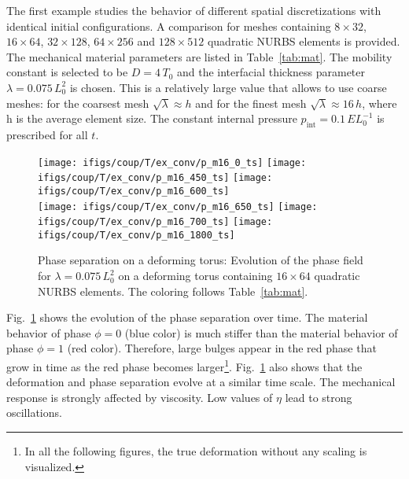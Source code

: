 \documentclass[11pt]{article}
\begin{document}
The first example studies the behavior of different spatial discretizations with identical initial configurations. 
A comparison for meshes containing $8 \times 32$, $16 \times 64$,  $32 \times 128$, $64 \times 256$ and  $128 \times 512$ quadratic NURBS elements is provided. 
The mechanical material parameters are listed in Table~\ref{tab:mat}. 
The mobility constant is selected to be $D=4\,T_0$ and the interfacial thickness parameter $\lambda = 0.075\,L_0^2$ is chosen. 
This is a relatively large value that allows to use coarse meshes: for the coarsest mesh $\sqrt{\lambda}\approx h$ and for the finest mesh $\sqrt{\lambda}\approx 16\,h$, where h is the average element size. 
The constant internal pressure $p_{\mathrm{int}}=0.1\,EL_0^{-1}$ is prescribed for all $t$.
\begin{figure}[H]
\centering
\texttt{[image: ifigs/coup/T/ex\_conv/p\_m16\_0\_ts]}
\texttt{[image: ifigs/coup/T/ex\_conv/p\_m16\_450\_ts]}
\texttt{[image: ifigs/coup/T/ex\_conv/p\_m16\_600\_ts]}\\
\texttt{[image: ifigs/coup/T/ex\_conv/p\_m16\_650\_ts]}
\texttt{[image: ifigs/coup/T/ex\_conv/p\_m16\_700\_ts]}
\texttt{[image: ifigs/coup/T/ex\_conv/p\_m16\_1800\_ts]}
\caption{Phase separation on a deforming torus: Evolution of the phase field for $\lambda=0.075\,L_0^2$ on a deforming torus containing $16 \times 64$ quadratic NURBS elements. The coloring follows Table~\ref{tab:mat}.}
\label{fig:t_evo1}
\end{figure}
%
Fig.~\ref{fig:t_evo1} shows the evolution of the phase separation over time. 
The material behavior of phase $\phi=0$ (blue color) is much stiffer than the material behavior of phase $\phi=1$ (red color). 
Therefore, large bulges appear in the red phase that grow in time as the red phase becomes larger\footnote{In all the following figures, the true deformation without any scaling is visualized.}.
Fig.~\ref{fig:t_evo1} also shows that the deformation and phase separation evolve at a similar time scale. 
The mechanical response is strongly affected by viscosity.
Low values of $\eta$ lead to strong oscillations.
\end{document}

